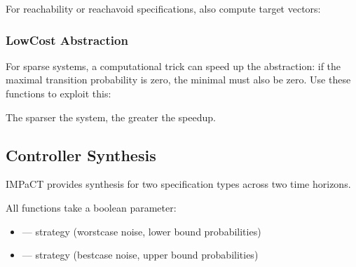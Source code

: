 \documentclass[a4paper,10pt,english]{sphinxmanual}
\begin{document}
\sphinxAtStartPar
For reachability or reach\sphinxhyphen{}avoid specifications, also compute target vectors:

\begin{sphinxVerbatim}[commandchars=\\\{\}]
\end{sphinxVerbatim}


\subsubsection{Low\sphinxhyphen{}Cost Abstraction}
\label{\detokenize{user-guide/synthesis:low-cost-abstraction}}
\sphinxAtStartPar
For sparse systems, a computational trick can speed up the abstraction: if the
maximal transition probability is zero, the minimal must also be zero. Use these
functions to exploit this:

\begin{sphinxVerbatim}[commandchars=\\\{\}]
\end{sphinxVerbatim}

\sphinxAtStartPar
The sparser the system, the greater the speedup.


\subsection{Controller Synthesis}
\label{\detokenize{user-guide/synthesis:controller-synthesis}}
\sphinxAtStartPar
IMPaCT provides synthesis for two specification types across two time horizons.

\sphinxAtStartPar
All functions take a boolean  parameter:
\begin{itemize}
\item {} 
\sphinxAtStartPar
{} —  strategy (worst\sphinxhyphen{}case noise, lower bound probabilities)

\item {} 
\sphinxAtStartPar
{} —  strategy (best\sphinxhyphen{}case noise, upper bound probabilities)

\end{itemize}
\end{document}
